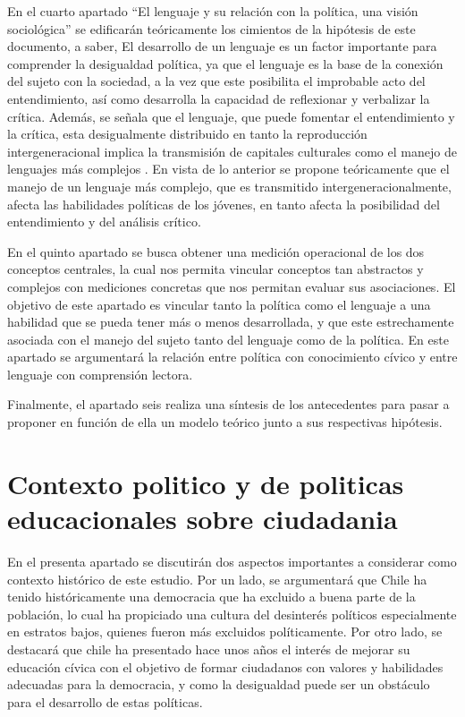 \documentclass[12pt,twoside]{templates/facsothesis}
\begin{document}
En el cuarto apartado ``El lenguaje y su relación con la política, una visión sociológica'' se edificarán teóricamente los cimientos de la hipótesis de este documento, a saber, El desarrollo de un lenguaje es un factor importante para comprender la desigualdad política, ya que el lenguaje es la base de la conexión del sujeto con la sociedad, a la vez que este posibilita el improbable acto del entendimiento, así como desarrolla la capacidad de reflexionar y verbalizar la crítica. Además, se señala que el lenguaje, que puede fomentar el entendimiento y la crítica, esta desigualmente distribuido en tanto la reproducción intergeneracional implica la transmisión de capitales culturales como el manejo de lenguajes más complejos . En vista de lo anterior se propone teóricamente que el manejo de un lenguaje más complejo, que es transmitido intergeneracionalmente, afecta las habilidades políticas de los jóvenes, en tanto afecta la posibilidad del entendimiento y del análisis crítico.

En el quinto apartado se busca obtener una medición operacional de los dos conceptos centrales, la cual nos permita vincular conceptos tan abstractos y complejos con mediciones concretas que nos permitan evaluar sus asociaciones. El objetivo de este apartado es vincular tanto la política como el lenguaje a una habilidad que se pueda tener más o menos desarrollada, y que este estrechamente asociada con el manejo del sujeto tanto del lenguaje como de la política. En este apartado se argumentará la relación entre política con conocimiento cívico y entre lenguaje con comprensión lectora.

Finalmente, el apartado seis realiza una síntesis de los antecedentes para pasar a proponer en función de ella un modelo teórico junto a sus respectivas hipótesis.

\hypertarget{contexto-politico-y-de-politicas-educacionales-sobre-ciudadania}{%
\section{Contexto politico y de politicas educacionales sobre ciudadania}\label{contexto-politico-y-de-politicas-educacionales-sobre-ciudadania}}

En el presenta apartado se discutirán dos aspectos importantes a considerar como contexto histórico de este estudio. Por un lado, se argumentará que Chile ha tenido históricamente una democracia que ha excluido a buena parte de la población, lo cual ha propiciado una cultura del desinterés políticos especialmente en estratos bajos, quienes fueron más excluidos políticamente. Por otro lado, se destacará que chile ha presentado hace unos años el interés de mejorar su educación cívica con el objetivo de formar ciudadanos con valores y habilidades adecuadas para la democracia, y como la desigualdad puede ser un obstáculo para el desarrollo de estas políticas.
\end{document}
